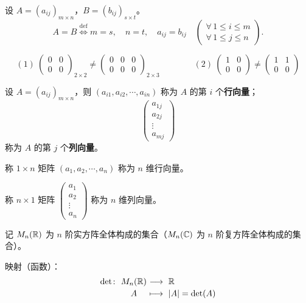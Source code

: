 \begin{definition}%
设 $A=(a_{ij})_{m\times n}$，$B=(b_{ij})_{s\times t}$。
\[
A=B\overset{\mathrm{def}}{\Longleftrightarrow}m=s,\quad n=t,\quad a_{ij}=b_{ij}
\quad\left(\substack{\forall\,1\le i\le m\\[1pt] \forall\,1\le j\le n}\right).
\]
\end{definition}

\begin{example}%
\[
(1)\ \begin{pmatrix}
0 & 0\\
0 & 0
\end{pmatrix}_{2\times2}
\neq
\begin{pmatrix}
0 & 0 & 0\\
0 & 0 & 0
\end{pmatrix}_{2\times3}
\qquad\qquad
(2)\ \begin{pmatrix}
1 & 0\\
0 & 0
\end{pmatrix}
\neq
\begin{pmatrix}
1 & 1\\
0 & 0
\end{pmatrix}
\]
\end{example}

\begin{definition}%
设 $A=(a_{ij})_{m\times n}$，则 $(a_{i1},a_{i2},\cdots,a_{in})$ 称为 $A$ 的第 $i$ 个\textbf{行向量}；
\[
\begin{pmatrix}
a_{1j}\\
a_{2j}\\
\vdots\\
a_{mj}
\end{pmatrix}
\]
称为 $A$ 的第 $j$ 个\textbf{列向量}。

称 $1\times n$ 矩阵 $(a_1,a_2,\cdots,a_n)$ 称为 $n$ 维行向量。

称 $n\times 1$ 矩阵 $\begin{pmatrix}a_1\\a_2\\\vdots\\a_n\end{pmatrix}$ 称为 $n$ 维列向量。
\end{definition}

记 $M_n(\mathbb{R})$ 为 $n$ 阶实方阵全体构成的集合（$M_n(\mathbb{C})$ 为 $n$ 阶复方阵全体构成的集合）。

映射（函数）：
\[
\begin{array}{r@{\ }c@{\ }l}
\det\colon & M_n(\R) & \longrightarrow\ \R\\[2pt]
& A & \longmapsto\ |A|=\det(A)
\end{array}
\]

